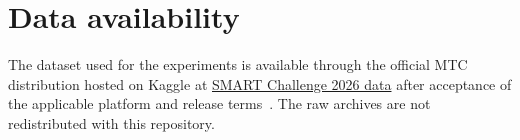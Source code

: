 \section*{Data availability}
\label{sec:data_availability}
The dataset used for the experiments is available through the official MTC distribution hosted on Kaggle at \href{https://www.kaggle.com/competitions/mtc-smart-challenge-ia-para-la-movilidad-del-peru/data}{SMART Challenge 2026 data} after acceptance of the applicable platform and release terms~\cite{MTC2026SmartChallenge}. The raw archives are not redistributed with this repository.
